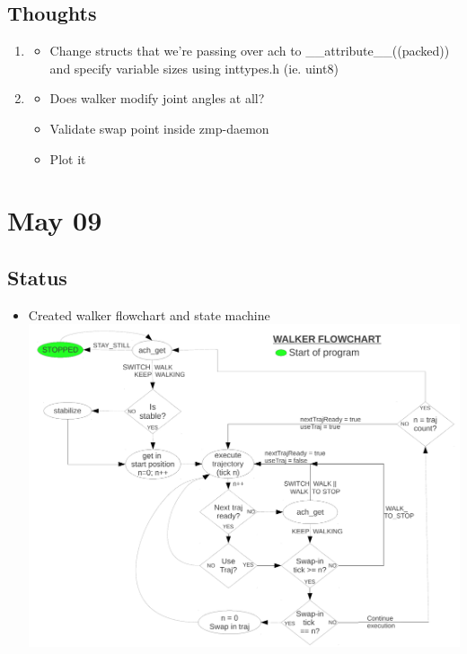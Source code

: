 \documentclass[letterpaper, 10 pt]{report}
\begin{document}
\subsection*{Thoughts}
\begin{enumerate}
\item
\begin{itemize}
\item Change structs that we're passing over ach to \_\_attribute\_\_((packed)) and specify variable sizes using inttypes.h (ie. uint8)
\end{itemize}
\item
\begin{itemize}
\item Does walker modify joint angles at all?
\item Validate swap point inside zmp-daemon
\item Plot it
\end{itemize}
\end{enumerate}

\section*{May 09}
\subsection*{Status}
\begin{itemize}
\item Created walker flowchart and state machine
\newline \includegraphics[width=\linewidth]{resources/walker-flowchart}
\end{itemize}
\end{document}
